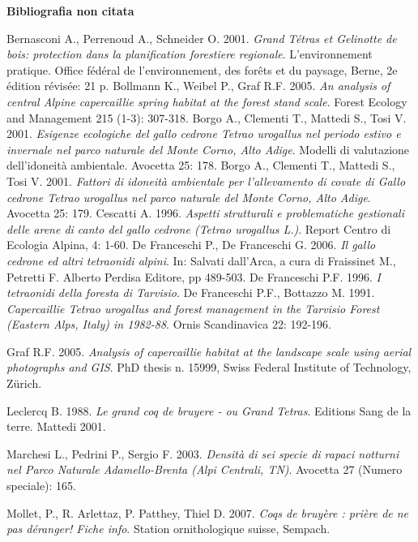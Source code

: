 \documentclass[10pt,twoside,openany,x11names,svgnames,italian,a5paper,dvipsnames,table]{memoir}
\begin{document}
\textbf{\large Bibliografia non citata}
\begin{thebibliography}{9}
\footnotesize
{}Bernasconi A., Perrenoud A., Schneider O. 2001. \emph{Grand Tétras et Gelinotte de bois: protection dans la planification forestiere regionale}. L’environnement pratique. Office fédéral de l’environnement, des forêts et du paysage, Berne, 2e édition révisée: 21 p.
Bollmann K., Weibel P., Graf R.F. 2005. \emph{An analysis of central Alpine capercaillie spring habitat at the forest stand scale}. Forest Ecology and Management 215 (1-3): 307-318.
Borgo A., Clementi T., Mattedi S., Tosi V. 2001. \emph{Esigenze ecologiche del gallo cedrone \emph{Tetrao urogallus} nel periodo estivo e invernale nel parco naturale del Monte Corno, Alto Adige}. Modelli di valutazione dell'idoneità ambientale. Avocetta 25: 178.
Borgo A., Clementi T., Mattedi S., Tosi V. 2001. \emph{Fattori di idoneità ambientale per l'allevamento di covate di Gallo cedrone \emph{Tetrao urogallus} nel parco naturale del Monte Corno, Alto Adige}. Avocetta 25: 179.
Cescatti A. 1996. \emph{Aspetti strutturali e problematiche gestionali delle arene di canto del gallo cedrone (\emph{Tetrao urogallus} L.)}. Report Centro di Ecologia Alpina, 4: 1-60.
De Franceschi P., De Franceschi G. 2006. \emph{Il gallo cedrone ed altri tetraonidi alpini}. In: Salvati dall'Arca, a cura di Fraissinet M., Petretti F. Alberto Perdisa Editore, pp 489-503.
De Franceschi P.F. 1996. \emph{I tetraonidi della foresta di Tarvisio}.
De Franceschi P.F., Bottazzo M. 1991. \emph{Capercaillie \emph{Tetrao urogallus} and forest management in the Tarvisio Forest (Eastern Alps, Italy) in 1982-88}. Ornis Scandinavica 22: 192-196.

Graf R.F. 2005. \emph{Analysis of capercaillie habitat at the landscape scale using aerial photographs and GIS}. PhD thesis n. 15999, Swiss Federal Institute of Technology, Zürich.

Leclercq B. 1988. \emph{Le grand coq de bruyere - ou Grand Tetras}. Editions Sang de la terre. Mattedi 2001. 
 
Marchesi L., Pedrini P., Sergio F. 2003. \emph{Densità di sei specie di rapaci notturni nel Parco Naturale Adamello-Brenta (Alpi Centrali, TN)}. Avocetta 27 (Numero speciale): 165.



Mollet, P., R. Arlettaz, P. Patthey, Thiel D. 2007. \emph{Coqs de bruyère : prière de ne pas déranger! Fiche info}. Station ornithologique suisse, Sempach.


\end{thebibliography}
\end{document}

